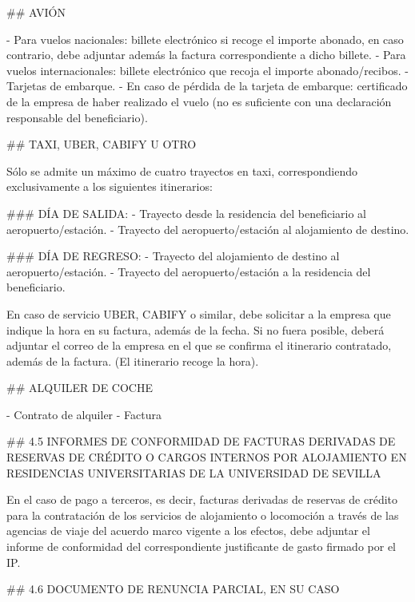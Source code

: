 \documentclass{article}
\begin{document}
\begin{itemize}
\begin{itemize}
\begin{scriptsize}
                  \#\# AVIÓN

                  - Para vuelos nacionales: billete electrónico si recoge el importe abonado, en caso contrario, debe adjuntar además la factura correspondiente a dicho billete.
                  - Para vuelos internacionales: billete electrónico que recoja el importe abonado/recibos.
                  - Tarjetas de embarque.
                  - En caso de pérdida de la tarjeta de embarque: certificado de la empresa de haber realizado el vuelo (no es suficiente con una declaración responsable del beneficiario).

                  \#\# TAXI, UBER, CABIFY U OTRO

                  Sólo se admite un máximo de cuatro trayectos en taxi, correspondiendo exclusivamente a los siguientes itinerarios:

                  \#\#\# DÍA DE SALIDA:
                  - Trayecto desde la residencia del beneficiario al aeropuerto/estación.
                  - Trayecto del aeropuerto/estación al alojamiento de destino.

                  \#\#\# DÍA DE REGRESO:
                  - Trayecto del alojamiento de destino al aeropuerto/estación.
                  - Trayecto del aeropuerto/estación a la residencia del beneficiario.

                  En caso de servicio UBER, CABIFY o similar, debe solicitar a la empresa que indique la hora en su factura, además de la fecha. Si no fuera posible, deberá adjuntar el correo de la empresa en el que se confirma el itinerario contratado, además de la factura. (El itinerario recoge la hora).

                  \#\# ALQUILER DE COCHE

                  - Contrato de alquiler
                  - Factura

                  \#\# 4.5 INFORMES DE CONFORMIDAD DE FACTURAS DERIVADAS DE RESERVAS DE CRÉDITO O CARGOS INTERNOS POR ALOJAMIENTO EN RESIDENCIAS UNIVERSITARIAS DE LA UNIVERSIDAD DE SEVILLA

                  En el caso de pago a terceros, es decir, facturas derivadas de reservas de crédito para la contratación de los servicios de alojamiento o locomoción a través de las agencias de viaje del acuerdo marco vigente a los efectos, debe adjuntar el informe de conformidad del correspondiente justificante de gasto firmado por el IP.

                  \#\# 4.6 DOCUMENTO DE RENUNCIA PARCIAL, EN SU CASO


\end{scriptsize}
\end{itemize}
\end{itemize}
\end{document}
